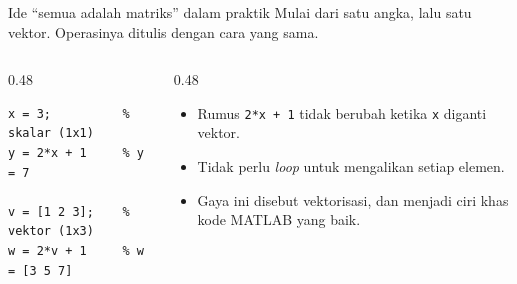 \documentclass[aspectratio=169,11pt]{beamer}
\begin{document}
\begin{frame}[fragile]{Ide ``semua adalah matriks'' dalam praktik}
Mulai dari satu angka, lalu satu vektor. Operasinya ditulis dengan cara yang
sama.
\vspace{0.4em}
\begin{columns}[T]
\begin{column}{0.48\textwidth}
\begin{lstlisting}
x = 3;          % skalar (1x1)
y = 2*x + 1     % y = 7

v = [1 2 3];    % vektor (1x3)
w = 2*v + 1     % w = [3 5 7]
\end{lstlisting}
\end{column}
\begin{column}{0.48\textwidth}
\small
\begin{itemize}
  \item Rumus \texttt{2*x + 1} tidak berubah ketika \texttt{x} diganti
        vektor.
  \item Tidak perlu \emph{loop} untuk mengalikan setiap elemen.
  \item Gaya ini disebut \alert{vektorisasi}, dan menjadi ciri khas
        kode MATLAB yang baik.
\end{itemize}
\end{column}
\end{columns}
\end{frame}
\end{document}
